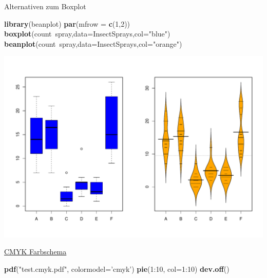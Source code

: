 \documentclass[ignorenonframetext,]{beamer}
\newenvironment{Shaded}{}{}
\newcommand{\KeywordTok}[1]{\textcolor[rgb]{0.00,0.44,0.13}{\textbf{{#1}}}}
\newcommand{\DataTypeTok}[1]{\textcolor[rgb]{0.56,0.13,0.00}{{#1}}}
\newcommand{\DecValTok}[1]{\textcolor[rgb]{0.25,0.63,0.44}{{#1}}}
\newcommand{\StringTok}[1]{\textcolor[rgb]{0.25,0.44,0.63}{{#1}}}
\newcommand{\NormalTok}[1]{{#1}}
\begin{document}
\begin{frame}[fragile]{Alternativen zum Boxplot}

\begin{Shaded}
\begin{Highlighting}[]
\KeywordTok{library}\NormalTok{(beanplot)}
\KeywordTok{par}\NormalTok{(}\DataTypeTok{mfrow =} \KeywordTok{c}\NormalTok{(}\DecValTok{1}\NormalTok{,}\DecValTok{2}\NormalTok{))}
\KeywordTok{boxplot}\NormalTok{(count~spray,}\DataTypeTok{data=}\NormalTok{InsectSprays,}\DataTypeTok{col=}\StringTok{"blue"}\NormalTok{)}
\KeywordTok{beanplot}\NormalTok{(count~spray,}\DataTypeTok{data=}\NormalTok{InsectSprays,}\DataTypeTok{col=}\StringTok{"orange"}\NormalTok{)}
\end{Highlighting}
\end{Shaded}

\includegraphics{R_intern_files/figure-beamer/unnamed-chunk-219-1.pdf}

\end{frame}

\begin{frame}[fragile]{\href{https://www.r-bloggers.com/draw-figures-in-cmyk-mode-in-r/}{CMYK
Farbschema}}

\begin{Shaded}
\begin{Highlighting}[]
\KeywordTok{pdf}\NormalTok{(}\StringTok{"test.cmyk.pdf"}\NormalTok{, }\DataTypeTok{colormodel=}\StringTok{'cmyk'}\NormalTok{)}
\KeywordTok{pie}\NormalTok{(}\DecValTok{1}\NormalTok{:}\DecValTok{10}\NormalTok{, }\DataTypeTok{col=}\DecValTok{1}\NormalTok{:}\DecValTok{10}\NormalTok{)}
\KeywordTok{dev.off}\NormalTok{() }
\end{Highlighting}
\end{Shaded}

\end{frame}
\end{document}
